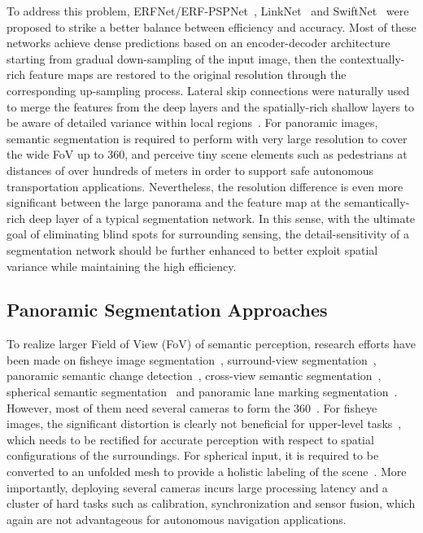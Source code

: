 \documentclass[letterpaper, 10 pt, conference]{ieeeconf}
\begin{document}
To address this problem, ERFNet/ERF-PSPNet~\cite{yang2018unifying}\cite{romera2019bridging}, LinkNet~\cite{chaurasia2017linknet} and SwiftNet~\cite{orsic2019defense}\cite{xiang2019comparative} were proposed to strike a better balance between efficiency and accuracy. Most of these networks achieve dense predictions based on an encoder-decoder architecture starting from gradual down-sampling of the input image, then the contextually-rich feature maps are restored to the original resolution through the corresponding up-sampling process. Lateral skip connections were naturally used to merge the features from the deep layers and the spatially-rich shallow layers to be aware of detailed variance within local regions~\cite{ronneberger2015u}\cite{chaurasia2017linknet}\cite{orsic2019defense}. For panoramic images, semantic segmentation is required to perform with very large resolution to cover the wide FoV up to 360, and perceive tiny scene elements such as pedestrians at distances of over hundreds of meters in order to support safe autonomous transportation applications. Nevertheless, the resolution difference is even more significant between the large panorama and the feature map at the semantically-rich deep layer of a typical segmentation network. In this sense, with the ultimate goal of eliminating blind spots for surrounding sensing, the detail-sensitivity of a segmentation network should be further enhanced to better exploit spatial variance while maintaining the high efficiency.

\subsection{Panoramic Segmentation Approaches}

To realize larger Field of View (FoV) of semantic perception, research efforts have been made on fisheye image segmentation~\cite{deng2017cnn}, surround-view segmentation~\cite{deng2019restricted}\cite{yahiaoui2019fisheyemodnet}\cite{iordache2019low}, panoramic semantic change detection~\cite{sakurada2018weakly}, cross-view semantic segmentation~\cite{pan2019cross}, spherical semantic segmentation~\cite{zhang2019orientation} and panoramic lane marking segmentation~\cite{jiang2019dfnet}. However, most of them need several cameras to form the 360~\cite{deng2019restricted}\cite{yahiaoui2019fisheyemodnet}\cite{pan2019cross}\cite{jiang2019dfnet}. For fisheye images, the significant distortion is clearly not beneficial for upper-level tasks~\cite{deng2017cnn}, which needs to be rectified for accurate perception with respect to spatial configurations of the surroundings. For spherical input, it is required to be converted to an unfolded mesh to provide a holistic labeling of the scene~\cite{zhang2019orientation}. More importantly, deploying several cameras incurs large processing latency and a cluster of hard tasks such as calibration, synchronization and sensor fusion, which again are not advantageous for autonomous navigation applications.
\end{document}
